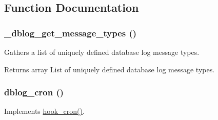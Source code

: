 \subsection{Function Documentation}
\hypertarget{dblog_8module_af0ae00c02019af60bf16b047cdf63bed}{
\subsubsection[{\_\-dblog\_\-get\_\-message\_\-types}]{\setlength{\rightskip}{0pt plus 5cm}\_\-dblog\_\-get\_\-message\_\-types ()}}
\label{dblog_8module_af0ae00c02019af60bf16b047cdf63bed}
Gathers a list of uniquely defined database log message types.

\begin{DoxyReturn}{Returns}
array List of uniquely defined database log message types. 
\end{DoxyReturn}
\hypertarget{dblog_8module_a19bb31e148bfbf3f76344cd9f7672f73}{
\subsubsection[{dblog\_\-cron}]{\setlength{\rightskip}{0pt plus 5cm}dblog\_\-cron ()}}
\label{dblog_8module_a19bb31e148bfbf3f76344cd9f7672f73}
Implements \hyperlink{group__hooks_gaf07f1e3d98112fc2ba6920cf7ee6fb16}{hook\_\-cron()}.

